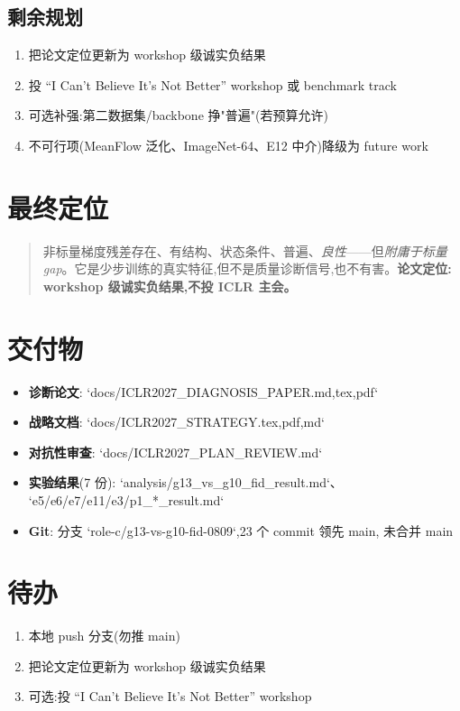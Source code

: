 \documentclass[UTF8,11pt,a4paper]{ctexart}
\begin{document}
\subsection{剩余规划}
\begin{enumerate}[leftmargin=*,itemsep=1pt]
  \item 把论文定位更新为 workshop 级诚实负结果
  \item 投 ``I Can't Believe It's Not Better'' workshop 或 benchmark track
  \item 可选补强:第二数据集/backbone 挣"普遍"(若预算允许)
  \item 不可行项(MeanFlow 泛化、ImageNet-64、E12 中介)降级为 future work
\end{enumerate}

\section{最终定位}
\label{sec:position}

\begin{quote}
非标量梯度残差存在、有结构、状态条件、普遍、\emph{良性}——但\emph{附庸于标量
gap}。它是少步训练的真实特征,但不是质量诊断信号,也不有害。\textbf{论文定位:
workshop 级诚实负结果,不投 ICLR 主会。}
\end{quote}

\section{交付物}
\label{sec:deliverables}

\begin{itemize}
  \item \textbf{诊断论文}: `docs/ICLR2027\_DIAGNOSIS\_PAPER.{md,tex,pdf}`
  \item \textbf{战略文档}: `docs/ICLR2027\_STRATEGY.{tex,pdf,md}`
  \item \textbf{对抗性审查}: `docs/ICLR2027\_PLAN\_REVIEW.md`
  \item \textbf{实验结果}(7 份): `analysis/g13\_vs\_g10\_fid\_result.md`、
        `e5/e6/e7/e11/e3/p1\_*\_result.md`
  \item \textbf{Git}: 分支 `role-c/g13-vs-g10-fid-0809`,23 个 commit 领先 main,
        未合并 main
\end{itemize}

\section{待办}
\label{sec:todo}

\begin{enumerate}[leftmargin=*,itemsep=1pt]
  \item 本地 push 分支(勿推 main)
  \item 把论文定位更新为 workshop 级诚实负结果
  \item 可选:投 ``I Can't Believe It's Not Better'' workshop
\end{enumerate}
\end{document}

